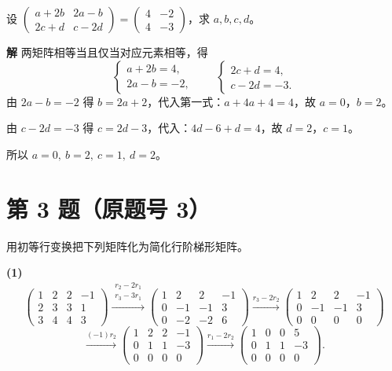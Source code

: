 \documentclass[11pt,a4paper]{ctexart}
\newcommand{\rt}[1]{\xrightarrow{#1}}
\newenvironment{problem}[1]
  {\par\medskip\noindent\textbf{#1}\quad}
  {\par}
\newenvironment{solution}
  {\par\noindent\textbf{解}\quad}
  {\par}
\begin{document}
\begin{problem}{}设
$\begin{pmatrix}a+2b&2a-b\\2c+d&c-2d\end{pmatrix}=\begin{pmatrix}4&-2\\4&-3\end{pmatrix}$，求 $a,b,c,d$。
\end{problem}

\begin{solution}
两矩阵相等当且仅当对应元素相等，得
\[
\begin{cases}a+2b=4,\\ 2a-b=-2,\end{cases}\qquad
\begin{cases}2c+d=4,\\ c-2d=-3.\end{cases}
\]
由 $2a-b=-2$ 得 $b=2a+2$，代入第一式：$a+4a+4=4$，故 $a=0$，$b=2$。

由 $c-2d=-3$ 得 $c=2d-3$，代入：$4d-6+d=4$，故 $d=2$，$c=1$。

所以 $a=0,\ b=2,\ c=1,\ d=2$。
\end{solution}

\section*{第 3 题（原题号 3）}

\begin{problem}{}用初等行变换把下列矩阵化为简化行阶梯形矩阵。\end{problem}

\textbf{(1)}
\[
\begin{pmatrix}1&2&2&-1\\2&3&3&1\\3&4&4&3\end{pmatrix}
\rt{\substack{r_2-2r_1\\ r_3-3r_1}}
\begin{pmatrix}1&2&2&-1\\0&-1&-1&3\\0&-2&-2&6\end{pmatrix}
\rt{r_3-2r_2}
\begin{pmatrix}1&2&2&-1\\0&-1&-1&3\\0&0&0&0\end{pmatrix}
\]
\[
\rt{(-1)r_2}
\begin{pmatrix}1&2&2&-1\\0&1&1&-3\\0&0&0&0\end{pmatrix}
\rt{r_1-2r_2}
\begin{pmatrix}1&0&0&5\\0&1&1&-3\\0&0&0&0\end{pmatrix}.
\]
\end{document}
